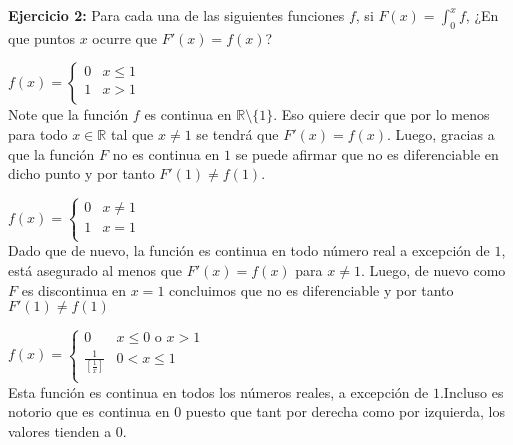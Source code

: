 \documentclass[../../main.tex]{subfiles}
\begin{document}
    \question \textbf{Ejercicio 2:} Para cada una de las siguientes funciones $f$, si $F(x) = \int_{0}^x f$,
    ¿En que puntos $x$ ocurre que $F'(x) = f(x)$?
    \begin{partes}
        \parte $f(x) = \begin{cases}
            0 & x \le 1\\
            1 & x > 1\\
        \end{cases}$\\

        Note que la función $f$ es continua en $\mathbb{R} \setminus \{1\}$. Eso quiere decir que por lo menos para todo $x \in \mathbb{R}$ tal que
        $x \neq 1$ se tendrá que $F'(x) = f(x)$. Luego, gracias a que la función $F$ no es continua en $1$ se puede afirmar que no es diferenciable en dicho
        punto y por tanto $F'(1) \neq f(1)$.

        \parte $f(x) = \begin{cases}
            0 & x \neq 1\\
            1 & x = 1\\
        \end{cases}$\\

        Dado que de nuevo, la función es continua en todo número real a excepción de $1$, está asegurado al menos que $F'(x) = f(x)$ para $x \neq 1$.
        Luego, de nuevo como $F$ es discontinua en $x = 1$ concluimos que no es diferenciable y por tanto $F'(1) \neq f(1)$


        \parte $f(x) = \begin{cases}
            0 & x\le 0 \text{ o } x > 1\\
            \frac{1}{\left[\frac{1}{x}\right]} & 0 < x \le 1\\
        \end{cases}$\\

        Esta función es continua en todos los números reales, a excepción de $1$.Incluso es notorio que es continua en $0$
        puesto que tant por derecha como por izquierda, los valores tienden a $0$. 
    \end{partes}
\end{document}
